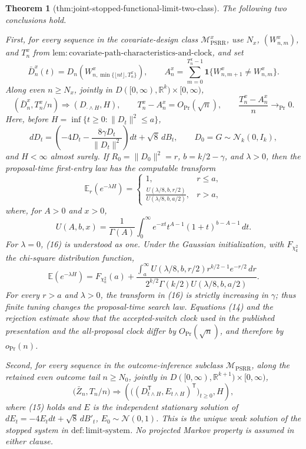 \documentclass{article}
\newtheorem{theorem}{Theorem}
\begin{document}
\begin{theorem}[thm:joint-stopped-functional-limit-two-class]\label{thm:joint-stopped-functional-limit-two-class}
The following two conclusions hold.

First, for every sequence in the covariate-design class \(\mathcal M_{\mathrm{PSRR}}^{x}\), use \(N_x\), \((W^x_{n,m})\), and \(T_n^x\) from \(\mathrm{lem{:}covariate\mbox{-}path\mbox{-}characteristics\mbox{-}and\mbox{-}clock}\), and set
\[
 \bar D_n^x(t)=D_n\!\left(W^x_{n,\min\{\lfloor nt\rfloor,T_n^x\}}\right),
 \qquad
 A_n^x=\sum_{m=0}^{T_n^x-1}\mathbf 1\{W^x_{n,m+1}\ne W^x_{n,m}\}.
\]
Along even \(n\ge N_x\), jointly in \(D([0,\infty),\mathbb R^k)\times[0,\infty)\),
\[
 (\bar D_n^x,T_n^x/n)\Rightarrow(D_{\cdot\wedge H},H),
 \qquad T_n^x-A_n^x=O_{\Pr}(\sqrt n),
 \qquad \frac{T_n^x-A_n^x}{n}\longrightarrow_{\Pr}0. \tag{14}
\]
Here, before \(H=\inf\{t\ge0:\|D_t\|^2\le a\}\),
\[
 dD_t=\left(-4D_t-\frac{8\gamma D_t}{\|D_t\|^2}\right)dt+\sqrt8\,dB_t,
 \qquad D_0=G\sim\mathcal N_k(0,I_k), \tag{15}
\]
and \(H<\infty\) almost surely.  If \(R_0=\|D_0\|^2=r\), \(b=k/2-\gamma\), and \(\lambda>0\), then the proposal-time first-entry law has the computable transform
\[
 \mathbb E_r(e^{-\lambda H})=
 \begin{cases}
 1,&r\le a,\\[2mm]
 \displaystyle\frac{U(\lambda/8,b,r/2)}{U(\lambda/8,b,a/2)},&r>a,
 \end{cases} \tag{16}
\]
where, for \(A>0\) and \(x>0\),
\[
 U(A,b,x)=\frac1{\Gamma(A)}\int_0^\infty e^{-xt}t^{A-1}(1+t)^{b-A-1}\,dt. \tag{17}
\]
For \(\lambda=0\), (16) is understood as one.  Under the Gaussian initialization, with \(F_{\chi_k^2}\) the chi-square distribution function,
\[
 \mathbb E(e^{-\lambda H})=F_{\chi_k^2}(a)+
 \frac{\displaystyle\int_a^\infty U(\lambda/8,b,r/2)r^{k/2-1}e^{-r/2}\,dr}
 {\displaystyle 2^{k/2}\Gamma(k/2)U(\lambda/8,b,a/2)}. \tag{18}
\]
For every \(r>a\) and \(\lambda>0\), the transform in (16) is strictly increasing in \(\gamma\); thus finite tuning changes the proposal-time search law.  Equations (14) and the rejection estimate show that the accepted-switch clock used in the published presentation and the all-proposal clock differ by \(O_{\Pr}(\sqrt n)\), and therefore by \(o_{\Pr}(n)\).

Second, for every sequence in the outcome-inference subclass \(\mathcal M_{\mathrm{PSRR}}\), along the retained even outcome tail \(n\ge N_0\), jointly in \(D([0,\infty),\mathbb R^{k+1})\times[0,\infty)\),
\[
 \bigl(\bar Z_n,T_n/n\bigr)\Rightarrow
 \left(\bigl((D_{t\wedge H}^{\mathsf T},E_{t\wedge H})^{\mathsf T}\bigr)_{t\ge0},H\right), \tag{19}
\]
where (15) holds and \(E\) is the independent stationary solution of \(dE_t=-4E_tdt+\sqrt8\,dB'_t\), \(E_0\sim\mathcal N(0,1)\).  This is the unique weak solution of the stopped system in \(\mathrm{def{:}limit\mbox{-}system}\).  No projected Markov property is assumed in either clause.
\end{theorem}
\end{document}
